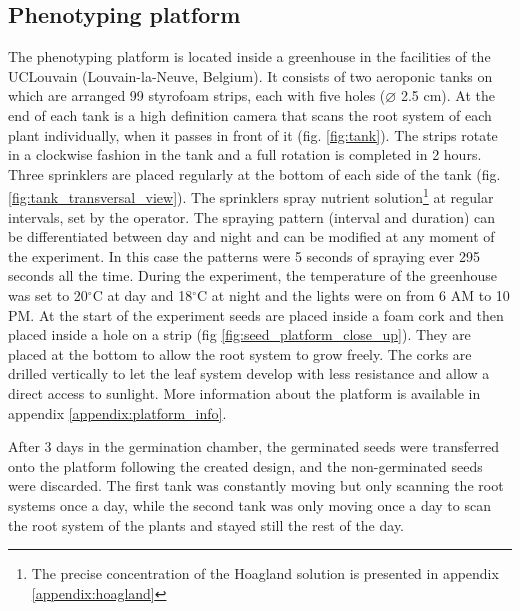 \subsection{Phenotyping platform}
The phenotyping platform is located inside a greenhouse in the facilities of the UCLouvain (Louvain-la-Neuve, Belgium). 
It consists of two aeroponic tanks on which are arranged 99 styrofoam strips, each with five holes ($\diameter$ 2.5 cm). 
At the end of each tank is a high definition camera that scans the root system of each plant individually, when it passes in front of it (fig. \ref{fig:tank}). 
The strips rotate in a clockwise fashion in the tank and a full rotation is completed in 2 hours. 
Three sprinklers are placed regularly at the bottom of each side of the tank (fig. \ref{fig:tank_transversal_view}). 
The sprinklers spray nutrient solution\footnote{The precise concentration of the Hoagland solution is presented in appendix \ref{appendix:hoagland}} at regular intervals, set by the operator. 
The spraying pattern (interval and duration) can be differentiated between day and night and can be modified at any moment of the experiment.
In this case the patterns were 5 seconds of spraying ever 295 seconds all the time.
During the experiment, the temperature of the greenhouse was set to 20$^{\circ}$C at day and 18$^{\circ}$C at night and the lights were on from 6 AM to 10 PM. 
At the start of the experiment seeds are placed inside a foam cork and then placed inside a hole on a strip (fig \ref{fig:seed_platform_close_up}). 
They are placed at the bottom to allow the root system to grow freely. 
The corks are drilled vertically to let the leaf system develop with less resistance and allow a direct access to sunlight. 
More information about the platform is available in appendix \ref{appendix:platform_info}.

After 3 days in the germination chamber, the germinated seeds were transferred onto the platform following the created design, and the non-germinated seeds were discarded. The first tank was constantly moving but only scanning the root systems once a day, while the second tank was only moving once a day to scan the root system of the plants and stayed still the rest of the day.

